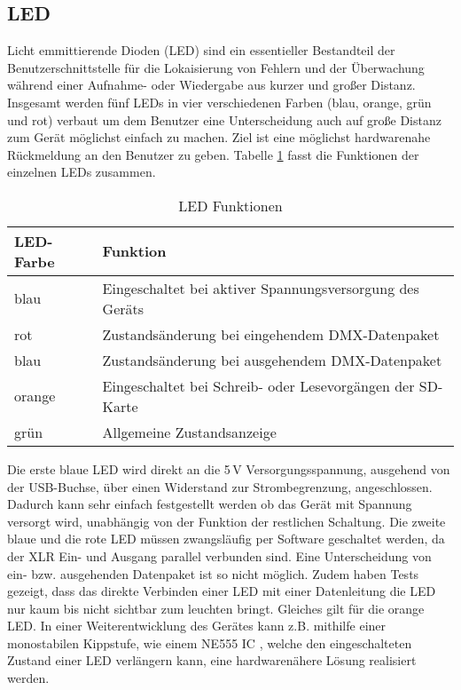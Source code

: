 
\subsection{LED}

Licht emmittierende Dioden (LED) sind ein essentieller Bestandteil der Benutzerschnittstelle für die Lokaisierung von Fehlern und der Überwachung während einer Aufnahme- oder Wiedergabe aus kurzer und großer Distanz. Insgesamt werden fünf LEDs in vier verschiedenen Farben (blau, orange, grün und rot) verbaut um dem Benutzer eine Unterscheidung auch auf große Distanz zum Gerät möglichst einfach zu machen. Ziel ist eine möglichst hardwarenahe Rückmeldung an den Benutzer zu geben. Tabelle \ref{table:LED} fasst die Funktionen der einzelnen LEDs zusammen. 
\begin{table}[h]
	\begin{center}
		\begin{tabular}{l | l}
				\textbf{LED-Farbe} & \textbf{Funktion}\\
				\hline
				blau & Eingeschaltet bei aktiver Spannungsversorgung des Geräts\\
				rot & Zustandsänderung bei eingehendem DMX-Datenpaket\\
				blau & Zustandsänderung bei ausgehendem DMX-Datenpaket\\
				orange & Eingeschaltet bei Schreib- oder Lesevorgängen der SD-Karte\\
				grün & Allgemeine Zustandsanzeige
		\end{tabular}
		\caption{LED Funktionen}
		\label{table:LED}
	\end{center}
\end{table}
Die erste blaue LED wird direkt an die 5\,V Versorgungsspannung, ausgehend von der USB-Buchse, über einen Widerstand zur Strombegrenzung, angeschlossen. Dadurch kann sehr einfach festgestellt werden ob das Gerät mit Spannung versorgt wird, unabhängig von der Funktion der restlichen Schaltung. Die zweite blaue und die rote LED müssen zwangsläufig per Software geschaltet werden, da der XLR Ein- und Ausgang parallel verbunden sind. Eine Unterscheidung von ein- bzw. ausgehenden Datenpaket ist so nicht möglich. Zudem haben Tests gezeigt, dass das direkte Verbinden einer LED mit einer Datenleitung die LED nur kaum bis nicht sichtbar zum leuchten bringt. Gleiches gilt für die orange LED. In einer Weiterentwicklung des Gerätes kann z.B. mithilfe einer monostabilen Kippstufe, wie einem NE555 IC \cite{NE555}, welche den eingeschalteten Zustand einer LED verlängern kann, eine hardwarenähere Lösung realisiert werden.
